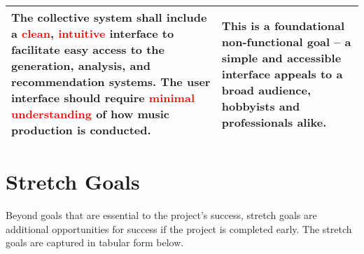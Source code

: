 \documentclass{article}
\begin{document}
\begin{table}[h!]
\begin{tabular}{p{} || p{}}
        \midrule
        The collective system shall include a \textcolor{red}{clean}, \textcolor{red}{intuitive} interface to facilitate easy access to the generation, analysis, and recommendation systems. The user interface should require \textcolor{red}{minimal understanding} of how music production is conducted. & This is a foundational non-functional goal -- a simple and accessible interface appeals to a broad audience, hobbyists and professionals alike. \\
        \bottomrule
    \end{tabular}
\end{table}

\newpage
\section{Stretch Goals}
Beyond goals that are essential to the project's success, stretch goals are additional opportunities for success if the project is completed early. The stretch goals are captured in tabular form below.
\end{document}
